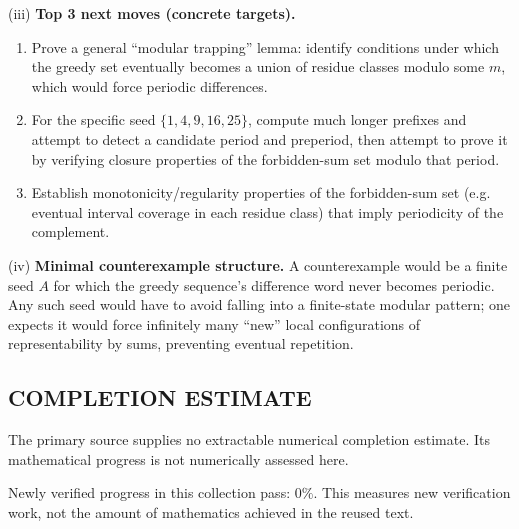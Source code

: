 \smallskip
\noindent (iii) \textbf{Top 3 next moves (concrete targets).}
\begin{enumerate}
\item Prove a general ``modular trapping'' lemma: identify conditions under which the greedy set eventually becomes a union of residue classes modulo some $m$, which would force periodic differences.
\item For the specific seed $\{1,4,9,16,25\}$, compute much longer prefixes and attempt to detect a candidate period and preperiod, then attempt to prove it by verifying closure properties of the forbidden-sum set modulo that period.
\item Establish monotonicity/regularity properties of the forbidden-sum set (e.g. eventual interval coverage in each residue class) that imply periodicity of the complement.
\end{enumerate}

\smallskip
\noindent (iv) \textbf{Minimal counterexample structure.}
A counterexample would be a finite seed $A$ for which the greedy sequence's difference word never becomes periodic. Any such seed would have to avoid falling into a finite-state modular pattern; one expects it would force infinitely many ``new'' local configurations of representability by sums, preventing eventual repetition.




\subsection*{COMPLETION ESTIMATE}
The primary source supplies no extractable numerical completion estimate. Its mathematical progress is not numerically assessed here.

Newly verified progress in this collection pass: $0\%$. This measures new verification work, not the amount of mathematics achieved in the reused text.

